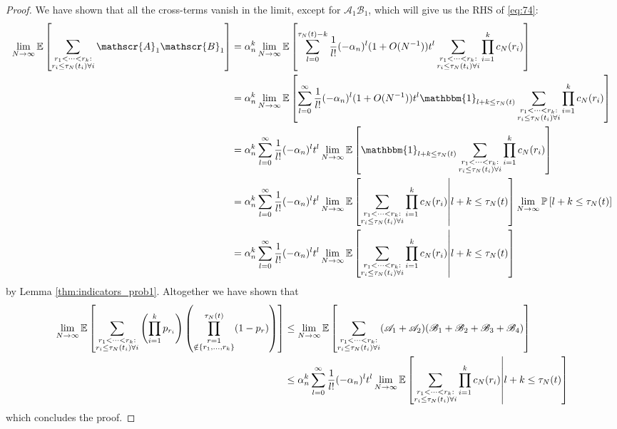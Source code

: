 \documentclass{article}
\newcommand{\Prob}{\mathbb{P}}
\newcommand{\E}{\mathbb{E}}
\newcommand{\1}[1]{\mathbbm{1}_{#1}}
\begin{document}
\begin{proof}
We have shown that all the cross-terms vanish in the limit, except for $\mathscr{A}_1 \mathscr{B}_1$, which will give us the RHS of \eqref{eq:74}:
\begin{align}
\lim_{N\to\infty}\E\left[ \sum_{\substack{r_1 <\dots< r_k :\\ r_i \leq \tau_N(t_i) \forall i}} \mathscr{A}_1 \mathscr{B}_1 \right]
&= \alpha_n^k  \lim_{N\to\infty}
\E\left[ \sum_{l=0}^{\tau_N(t) -k} \frac{1}{l!} (-\alpha_n)^l (1+O(N^{-1})) t^l \sum_{\substack{r_1 <\dots< r_k :\\ r_i \leq \tau_N(t_i) \forall i}} \prod_{i=1}^k  c_N(r_i) \right] \notag\\
&= \alpha_n^k  \lim_{N\to\infty}
\E\left[ \sum_{l=0}^{\infty} \frac{1}{l!} (-\alpha_n)^l (1+O(N^{-1})) t^l \1{l+k \leq \tau_N(t)} \sum_{\substack{r_1 <\dots< r_k :\\ r_i \leq \tau_N(t_i) \forall i}} \prod_{i=1}^k  c_N(r_i) \right] \notag\\
&= \alpha_n^k \sum_{l=0}^{\infty} \frac{1}{l!} (- \alpha_n)^l t^l \lim_{N\to\infty}
\E\left[ \1{l+k \leq \tau_N(t)} \sum_{\substack{r_1 <\dots< r_k :\\ r_i \leq \tau_N(t_i) \forall i}} \prod_{i=1}^k  c_N(r_i) \right] \notag\\ 
&= \alpha_n^k \sum_{l=0}^{\infty} \frac{1}{l!} (- \alpha_n)^l t^l \lim_{N\to\infty}
\E\left[ \sum_{\substack{r_1 <\dots< r_k :\\ r_i \leq \tau_N(t_i) \forall i}} \prod_{i=1}^k  c_N(r_i) \middle| l+k \leq \tau_N(t) \right] 
\lim_{N\to\infty} \Prob\left[ l+k \leq \tau_N(t) \right] \notag\\ 
&= \alpha_n^k \sum_{l=0}^{\infty} \frac{1}{l!} (- \alpha_n)^l t^l \lim_{N\to\infty}
\E\left[ \sum_{\substack{r_1 <\dots< r_k :\\ r_i \leq \tau_N(t_i) \forall i}} \prod_{i=1}^k  c_N(r_i) \middle| l+k \leq \tau_N(t) \right]
\end{align}
by Lemma \ref{thm:indicators_prob1}.
Altogether we have shown that 
\begin{align}
\lim_{N\to\infty} \E \left[ \sum_{\substack{r_1 <\dots< r_k :\\ r_i \leq \tau_N(t_i) \forall i}}
\left( \prod_{i=1}^k p_{r_i} \right)
\left( \prod_{\substack{r=1 \\ \notin \{r_1,\dots,r_k\} }}^{\tau_N(t)} (1-p_r) \right) \right]
&\leq \lim_{N\to\infty} \E \left[ \sum_{\substack{r_1 <\dots< r_k :\\ r_i \leq \tau_N(t_i) \forall i}}
(\mathscr{A}_1 + \mathscr{A}_2) (\mathscr{B}_1 + \mathscr{B}_2 + \mathscr{B}_3 + \mathscr{B}_4) \right] \notag\\
& \leq \alpha_n^k \sum_{l=0}^{\infty} \frac{1}{l!} (- \alpha_n)^l t^l \lim_{N\to\infty}
\E\left[ \sum_{\substack{r_1 <\dots< r_k :\\ r_i \leq \tau_N(t_i) \forall i}} \prod_{i=1}^k  c_N(r_i) \middle| l+k \leq \tau_N(t) \right] 
\end{align}
which concludes the proof.
\end{proof}
\end{document}
